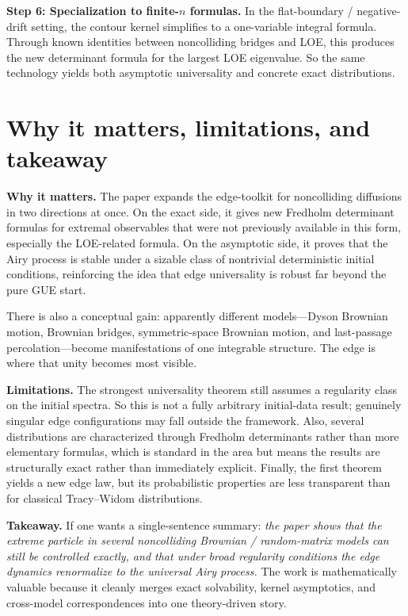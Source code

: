 \documentclass[11pt]{article}
\begin{document}
\textbf{Step 6: Specialization to finite-$n$ formulas.} In the flat-boundary / negative-drift setting, the contour kernel simplifies to a one-variable integral formula. Through known identities between noncolliding bridges and LOE, this produces the new determinant formula for the largest LOE eigenvalue. So the same technology yields both asymptotic universality and concrete exact distributions.

\section*{Why it matters, limitations, and takeaway}
\textbf{Why it matters.} The paper expands the edge-toolkit for noncolliding diffusions in two directions at once. On the exact side, it gives new Fredholm determinant formulas for extremal observables that were not previously available in this form, especially the LOE-related formula. On the asymptotic side, it proves that the Airy process is stable under a sizable class of nontrivial deterministic initial conditions, reinforcing the idea that edge universality is robust far beyond the pure GUE start.

There is also a conceptual gain: apparently different models---Dyson Brownian motion, Brownian bridges, symmetric-space Brownian motion, and last-passage percolation---become manifestations of one integrable structure. The edge is where that unity becomes most visible.

\textbf{Limitations.} The strongest universality theorem still assumes a regularity class on the initial spectra. So this is not a fully arbitrary initial-data result; genuinely singular edge configurations may fall outside the framework. Also, several distributions are characterized through Fredholm determinants rather than more elementary formulas, which is standard in the area but means the results are structurally exact rather than immediately explicit. Finally, the first theorem yields a new edge law, but its probabilistic properties are less transparent than for classical Tracy--Widom distributions.

\textbf{Takeaway.} If one wants a single-sentence summary: \emph{the paper shows that the extreme particle in several noncolliding Brownian / random-matrix models can still be controlled exactly, and that under broad regularity conditions the edge dynamics renormalize to the universal Airy process.} The work is mathematically valuable because it cleanly merges exact solvability, kernel asymptotics, and cross-model correspondences into one theory-driven story.
\end{document}
